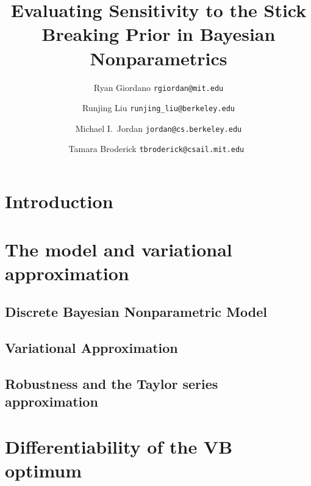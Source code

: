 \documentclass[11pt]{article}
\begin{document}



\title{Evaluating Sensitivity to the Stick Breaking Prior in Bayesian Nonparametrics}

\author{Ryan Giordano \texttt{rgiordan@mit.edu} \\
        \and
        Runjing Liu \texttt{runjing\_liu@berkeley.edu} \\
        \and
        Michael I.\ Jordan \texttt{jordan@cs.berkeley.edu} \\
        \and
        Tamara Broderick \texttt{tbroderick@csail.mit.edu }
        }

\maketitle

\begin{abstract}%

\end{abstract}


\section{Introduction}



\section{The model and variational approximation}
    \subsection{Discrete Bayesian Nonparametric Model}
    

    \subsection{Variational Approximation}
    

    \subsection{Robustness and the Taylor series approximation}
    


\section{Differentiability of the VB optimum}

\end{document}
